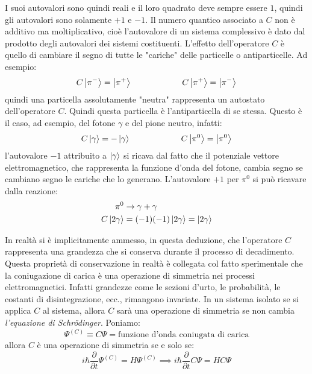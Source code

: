 I suoi autovalori sono quindi reali e il loro quadrato  deve sempre essere $1$,
quindi gli autovalori sono solamente $+1$ e $-1$. Il numero quantico associato a
$C$ non è additivo ma moltiplicativo, cioè l'autovalore di un sistema
complessivo è dato dal prodotto degli autovalori dei sistemi costituenti.
L'effetto dell'operatore $C$ è quello di cambiare il segno di tutte le 
"cariche"
delle particelle o antiparticelle. Ad esempio:
\begin{equation*}
C\Ket{\pi^-} = \Ket{\pi^+}	\qquad \qquad \qquad C\Ket{\pi^+} = \Ket{\pi^-}
\end{equation*}
quindi una particella assolutamente "neutra" rappresenta un autostato
dell'operatore $C$. Quindi questa particella è l'antiparticella di se stessa.
Questo è il caso, ad esempio, del fotone $\gamma$ e del pione neutro, infatti:
\begin{equation*}
C\Ket{\gamma} = - \Ket{\gamma} 	\qquad \qquad \qquad C\Ket{\pi^0} = \Ket{\pi^0}
\end{equation*}
l'autovalore $-1$ attribuito a $\Ket{\gamma}$ si ricava dal fatto che il
potenziale vettore elettromagnetico, che rappresenta la funzione d'onda del
fotone, cambia segno se cambiano segno le cariche che lo generano. L'autovalore
$+1$ per $\pi^0$ si può ricavare dalla reazione:
\begin{align*}
\pi^0 &\to \gamma+\gamma \\
C\Ket{2\gamma} &= (-1)(-1) \Ket{2\gamma} = \Ket{2\gamma}
\end{align*}

In realtà si è implicitamente ammesso, in questa deduzione, che l'operatore 
$C$
rappresenta una grandezza che si conserva durante il processo di decadimento.
Questa proprietà di conservazione in realtà è collegata col fatto 
sperimentale
che la coniugazione di carica è una operazione di simmetria nei processi
elettromagnetici. Infatti grandezze come le sezioni d'urto, le probabilità, le
costanti di disintegrazione, ecc., rimangono invariate. In un sistema isolato se
si applica $C$ al sistema, allora $C$ sarà una operazione di simmetria se non
cambia \textit{l'equazione di Schr\"odinger}. Poniamo:
\begin{equation*}
\Psi^{(C)} \equiv C \Psi = \text{funzione d'onda coniugata di carica}
\end{equation*}
allora $C$ è una operazione di simmetria se e solo se:
\begin{equation*}
i\hbar \dfrac{\partial}{\partial t} \Psi^{(C)} = H \Psi^{(C)} \implies i\hbar 
\dfrac{\partial}{\partial t} C \Psi = H C \Psi
\end{equation*}

